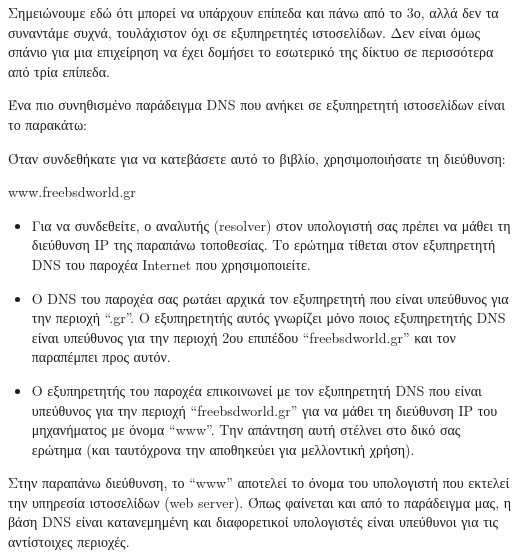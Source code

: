 Σημειώνουμε εδώ ότι μπορεί να υπάρχουν επίπεδα και πάνω από το 3ο, αλλά δεν τα συναντάμε συχνά, τουλάχιστον όχι σε εξυπηρετητές ιστοσελίδων. Δεν είναι όμως σπάνιο για μια επιχείρηση να έχει δομήσει το εσωτερικό της δίκτυο σε περισσότερα από τρία επίπεδα.

Ένα πιο συνηθισμένο παράδειγμα DNS που ανήκει σε εξυπηρετητή ιστοσελίδων είναι το παρακάτω:

Όταν συνδεθήκατε για να κατεβάσετε αυτό το βιβλίο, χρησιμοποιήσατε τη διεύθυνση:

\begin{center}
www.freebsdworld.gr
\end{center}

\begin{itemize}
\item Για να συνδεθείτε, ο αναλυτής (resolver) στον υπολογιστή σας πρέπει να μάθει τη διεύθυνση IP της παραπάνω τοποθεσίας. Το ερώτημα τίθεται στον εξυπηρετητή DNS του παροχέα Internet που χρησιμοποιείτε.
\item Ο DNS του παροχέα σας ρωτάει αρχικά τον εξυπηρετητή που είναι υπεύθυνος για την περιοχή ``.gr''. Ο εξυπηρετητής αυτός γνωρίζει μόνο ποιος  εξυπηρετητής DNS είναι υπεύθυνος για την περιοχή 2ου επιπέδου ``freebsdworld.gr'' και τον παραπέμπει προς αυτόν.
\item Ο εξυπηρετητής του παροχέα επικοινωνεί με τον εξυπηρετητή DNS που είναι υπεύθυνος για την περιοχή ``freebsdworld.gr'' για να μάθει τη διεύθυνση IP του μηχανήματος με όνομα ``www''. Την απάντηση αυτή στέλνει στο δικό σας ερώτημα (και ταυτόχρονα την αποθηκεύει για μελλοντική χρήση).
\end{itemize}

Στην παραπάνω διεύθυνση, το ``www'' αποτελεί το όνομα του υπολογιστή που εκτελεί την υπηρεσία ιστοσελίδων (web server). Όπως φαίνεται και από το παράδειγμα μας, η βάση DNS είναι κατανεμημένη και διαφορετικοί υπολογιστές είναι υπεύθυνοι για τις αντίστοιχες περιοχές.